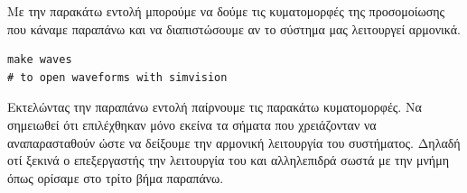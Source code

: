 \documentclass[a4paper,10pt]{article}
\numberwithin{figure}{section}
\numberwithin{table}{section}
\begin{document}
Με την παρακάτω εντολή μπορούμε να δούμε τις κυματομορφές της προσομοίωσης που κάναμε παραπάνω και να διαπιστώσουμε αν το σύστημα μας λειτουργεί αρμονικά.

\vspace{0.7cm}
\begin{lstlisting}
make waves
# to open waveforms with simvision
\end{lstlisting}
\vspace{0.7cm}

Εκτελώντας την παραπάνω εντολή παίρνουμε τις παρακάτω κυματομορφές. Να σημειωθεί ότι επιλέχθηκαν μόνο εκείνα τα σήματα που χρειάζονταν να αναπαρασταθούν ώστε να δείξουμε την αρμονική λειτουργία του συστήματος. Δηλαδή οτί ξεκινά ο επεξεργαστής την λειτουργία του και αλληλεπιδρά σωστά με την μνήμη όπως ορίσαμε στο τρίτο βήμα παραπάνω.
\end{document}
